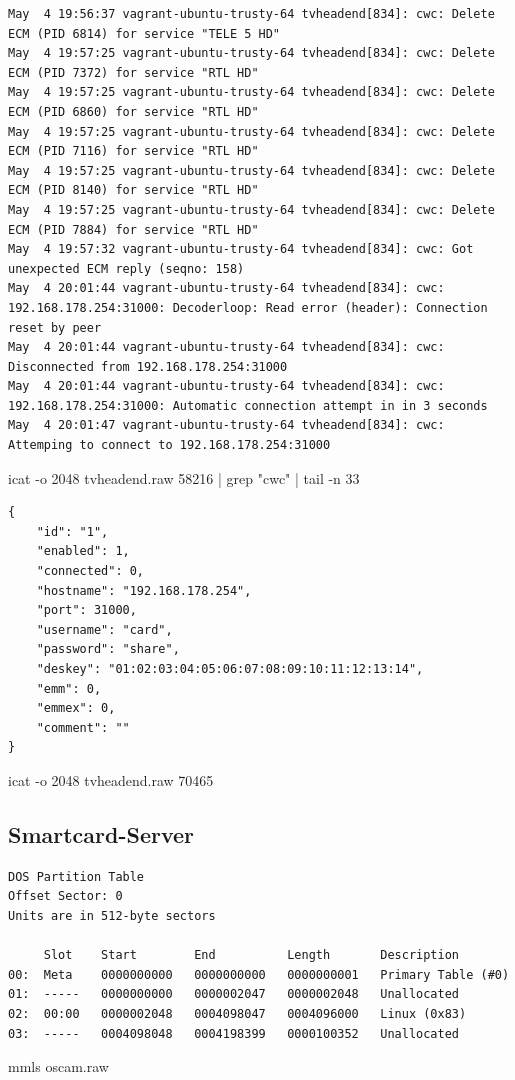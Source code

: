\begin{cmd}
\begin{Verbatim}[fontsize=\tiny]
May  4 19:56:37 vagrant-ubuntu-trusty-64 tvheadend[834]: cwc: Delete ECM (PID 6814) for service "TELE 5 HD"
May  4 19:57:25 vagrant-ubuntu-trusty-64 tvheadend[834]: cwc: Delete ECM (PID 7372) for service "RTL HD"
May  4 19:57:25 vagrant-ubuntu-trusty-64 tvheadend[834]: cwc: Delete ECM (PID 6860) for service "RTL HD"
May  4 19:57:25 vagrant-ubuntu-trusty-64 tvheadend[834]: cwc: Delete ECM (PID 7116) for service "RTL HD"
May  4 19:57:25 vagrant-ubuntu-trusty-64 tvheadend[834]: cwc: Delete ECM (PID 8140) for service "RTL HD"
May  4 19:57:25 vagrant-ubuntu-trusty-64 tvheadend[834]: cwc: Delete ECM (PID 7884) for service "RTL HD"
May  4 19:57:32 vagrant-ubuntu-trusty-64 tvheadend[834]: cwc: Got unexpected ECM reply (seqno: 158)
May  4 20:01:44 vagrant-ubuntu-trusty-64 tvheadend[834]: cwc: 192.168.178.254:31000: Decoderloop: Read error (header): Connection reset by peer
May  4 20:01:44 vagrant-ubuntu-trusty-64 tvheadend[834]: cwc: Disconnected from 192.168.178.254:31000
May  4 20:01:44 vagrant-ubuntu-trusty-64 tvheadend[834]: cwc: 192.168.178.254:31000: Automatic connection attempt in in 3 seconds
May  4 20:01:47 vagrant-ubuntu-trusty-64 tvheadend[834]: cwc: Attemping to connect to 192.168.178.254:31000
\end{Verbatim}
\caption{icat -o 2048 tvheadend.raw 58216 | grep "cwc" | tail -n 33}
\label{cmd:tvheadend-cwclog}
\end{cmd}

\begin{cmd}
\begin{verbatim}
{
	"id": "1",
	"enabled": 1,
	"connected": 0,
	"hostname": "192.168.178.254",
	"port": 31000,
	"username": "card",
	"password": "share",
	"deskey": "01:02:03:04:05:06:07:08:09:10:11:12:13:14",
	"emm": 0,
	"emmex": 0,
	"comment": ""
}
\end{verbatim}
\caption{icat -o 2048 tvheadend.raw 70465}
\label{cmd:tvheadend-cwc}
\end{cmd}

\subsection{Smartcard-Server}

\begin{cmd}[H]
\begin{verbatim}
DOS Partition Table
Offset Sector: 0
Units are in 512-byte sectors

     Slot    Start        End          Length       Description
00:  Meta    0000000000   0000000000   0000000001   Primary Table (#0)
01:  -----   0000000000   0000002047   0000002048   Unallocated
02:  00:00   0000002048   0004098047   0004096000   Linux (0x83)
03:  -----   0004098048   0004198399   0000100352   Unallocated
\end{verbatim}
\caption{mmls oscam.raw}
\label{cmd:oscam-mmls}
\end{cmd}

